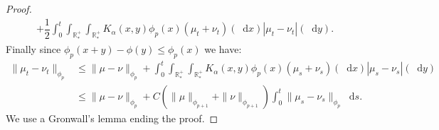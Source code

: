 \documentclass[11pt,a4paper]{article}
\newcommand{\RRP}{\mathbb{R}^+_*}
\newcommand{\MC}{\mathcal{M}}
\newcommand{\SCE}{\emph{SCE}}
\newcommand{\brac}[1]{\left\langle#1\right\rangle}
\newcommand{\dd}{\mathop{}\!\mathrm{d}}
\newtheorem{corollary}[theorem]{Corollary}
\begin{document}
\begin{proof}
\begin{multline*}
        + \dfrac12\int_0^t \int_{\RRP}\int_{\RRP} K_\alpha(x,y)\phi_p(x)\left(\mu_t + \nu_t\right)(\dd x) \left|\mu_t - \nu_t\right|(\dd y).
    \end{multline*}
    Finally since $\phi_p(x+y) - \phi(y) \leq \phi_p(x)$ we have:
    \begin{align*}
        \| \mu_t - \nu_t\|_{\phi_p} &\leq \|\mu- \nu\|_{\phi_p} + \int_0^t \int_{\RRP}\int_{\RRP} K_\alpha(x,y)\phi_p(x)\left(\mu_s + \nu_s\right)(\dd x) \left|\mu_s - \nu_s\right|(\dd y)\\
        &\leq \|\mu- \nu\|_{\phi_p} + C\left(\|\mu\|_{\phi_{p+1}} + \|\nu\|_{\phi_{p+1}}\right) \int_0^t \|\mu_s - \nu_s \|_{\phi_p}\dd s.
    \end{align*}
    We use a Gronwall's lemma ending the proof.
\end{proof}
\end{document}
